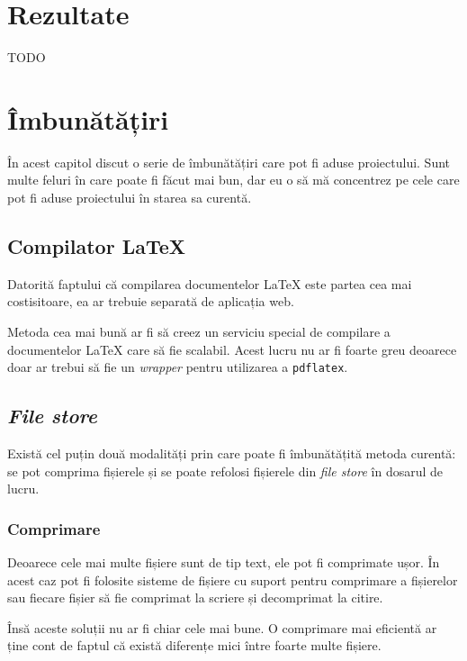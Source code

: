 \documentclass[a4wide,12pt]{report}
\newcommand{\eng}[1]{\emph{#1}} %
\newcommand{\cod}[1]{\texttt{#1}}
\newcommand{\idee}[1]{{\color{red} #1}}
\begin{document}
\chapter{Rezultate}

\idee{TODO}

\chapter{Îmbunătățiri}

În acest capitol discut o serie de îmbunătățiri care pot fi aduse proiectului.
Sunt multe feluri în care poate fi făcut mai bun, dar eu o să mă concentrez pe
cele care pot fi aduse proiectului în starea sa curentă.

\section{Compilator \LaTeX}
\label{comlatsec}

Datorită faptului că compilarea documentelor \LaTeX{} este partea cea mai
costisitoare, ea ar trebuie separată de aplicația web.

Metoda cea mai bună ar fi să creez un serviciu special de compilare a
documentelor \LaTeX{} care să fie scalabil. Acest lucru nu ar fi foarte greu
deoarece doar ar trebui să fie un \eng{wrapper} pentru utilizarea a
\cod{pdflatex}.

\section{\eng{File store}}
\label{filestoresec}

Există cel puțin două modalități prin care poate fi îmbunătățită metoda curentă:
se pot comprima fișierele și se poate refolosi fișierele din \eng{file store} în
dosarul de lucru.

\subsection{Comprimare}

Deoarece cele mai multe fișiere sunt de tip text, ele pot fi comprimate ușor.
În acest caz pot fi folosite sisteme de fișiere cu suport pentru comprimare
a fișierelor sau fiecare fișier să fie comprimat la scriere și decomprimat la
citire.

Însă aceste soluții nu ar fi chiar cele mai bune. O comprimare mai eficientă
ar ține cont de faptul că există diferențe mici între foarte multe fișiere.
\end{document}
